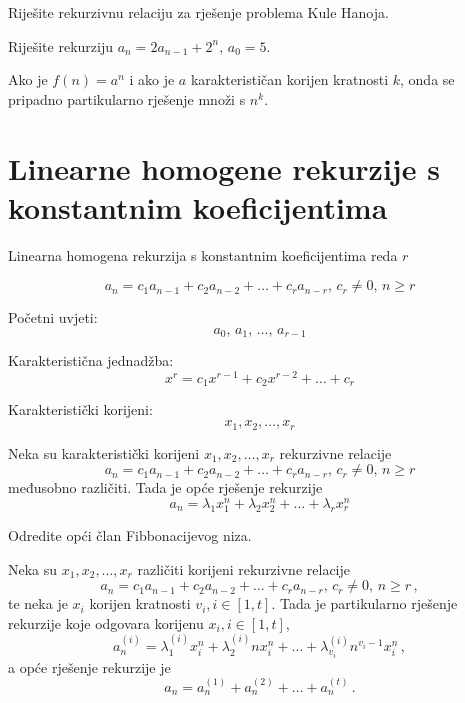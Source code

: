 \begin{example}
    Riješite rekurzivnu relaciju za rješenje problema Kule Hanoja.
\end{example}

\begin{example}
    Riješite rekurziju $a_n = 2a_{n-1}+2^n,\, a_0 = 5$.
\end{example}

Ako je $f(n) = a^n$ i ako je $a$ karakterističan korijen kratnosti $k$, onda se pripadno partikularno rješenje množi s $n^k$.

\section{Linearne homogene rekurzije s konstantnim koeficijentima}

Linearna homogena rekurzija s konstantnim koeficijentima reda $r$

$$
    a_n = c_1a_{n-1}+c_2a_{n-2}+\dots+c_ra_{n-r},\, c_r \neq 0,\, n \geq r
$$

Početni uvjeti:
$$
a_0,\, a_1,\, \dots,\, a_{r-1}
$$

Karakteristična jednadžba:
$$
x^r = c_1x^{r-1}+c_2x^{r-2}+\dots+c_r
$$

Karakteristički korijeni:
$$
x_1,x_2,\dots,x_r
$$

\begin{theorem}
    Neka su karakteristički korijeni $x_1,x_2,\dots,x_r$ rekurzivne relacije
    $$
        a_n = c_1a_{n-1}+c_2a_{n-2}+\dots+c_ra_{n-r},\, c_r \neq 0,\, n \geq r
    $$
    međusobno različiti. Tada je opće rješenje rekurzije
    $$
        a_n = \lambda_1x_1^n+\lambda_2x_2^n+\dots+\lambda_rx_r^n
    $$
\end{theorem}

\begin{example}
    Odredite opći član Fibbonacijevog niza.
\end{example}

\begin{theorem}
    Neka su $x_1,x_2,\dots,x_r$ različiti korijeni rekurzivne relacije
    $$
        a_n = c_1a_{n-1}+c_2a_{n-2}+\dots+c_ra_{n-r},\, c_r \neq 0,\, n \geq r\,,
    $$
    te neka je $x_i$ korijen kratnosti $v_i, i \in [1, t]$. Tada je partikularno rješenje rekurzije koje odgovara korijenu $x_i, i \in [1, t]$,
    $$
        a_n^{(i)} = \lambda_1^{(i)}x_i^n+\lambda_2^{(i)}nx_i^n+\dots+\lambda_{v_i}^{(i)}n^{v_i-1}x_i^n\,,
    $$
    a opće rješenje rekurzije je
    $$
        a_n = a_n^{(1)}+a_n^{(2)}+\dots+a_n^{(t)}\,.
    $$
\end{theorem}

